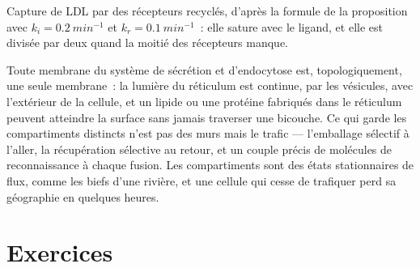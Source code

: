 \begin{omfigure}

{\small Capture de LDL par des récepteurs recyclés, d'après la formule
de la proposition avec $k_{i} = \qty{0.2}{min^{-1}}$ et $k_{r} =
\qty{0.1}{min^{-1}}$~: elle sature avec le ligand, et elle est divisée
par deux quand la moitié des récepteurs manque.}
\end{omfigure}

\begin{remark}\label{rem:b3:membrane-traffic:one-membrane}
Toute membrane du système de sécrétion et d'endocytose est,
topologiquement, une seule membrane~: la lumière du réticulum est
continue, par les vésicules, avec l'extérieur de la cellule, et un
lipide ou une protéine fabriqués dans le réticulum peuvent atteindre la
surface sans jamais traverser une bicouche. Ce qui garde les
compartiments distincts n'est pas des murs mais le trafic ---
l'emballage sélectif à l'aller, la récupération sélective au retour, et
un couple précis de molécules de reconnaissance à chaque fusion. Les
compartiments sont des états stationnaires de flux, comme les biefs
d'une rivière, et une cellule qui cesse de trafiquer perd sa géographie
en quelques heures.
\end{remark}

\section{Exercices}

